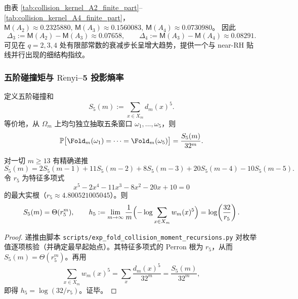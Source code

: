 \begin{remark}[有限部常数的步长加速（\(A_2\to A_4\)）]\label{rem:pom-collision-mertens-accel}
由表 \ref{tab:collision_kernel_A2_finite_part}--\ref{tab:collision_kernel_A4_finite_part}，
\(
\mathsf{M}(A_2)\approx 0.2325880,\,
\mathsf{M}(A_3)\approx 0.1560083,\,
\mathsf{M}(A_4)\approx 0.0730980
\)。
因此
\[
\Delta_3:=\mathsf{M}(A_2)-\mathsf{M}(A_3)\approx 0.07658,\qquad
\Delta_4:=\mathsf{M}(A_3)-\mathsf{M}(A_4)\approx 0.08291.
\]
可见在 \(q=2,3,4\) 处有限部常数的衰减步长呈增大趋势，提供一个与 near-RH 贴线并行出现的细结构指纹。
\end{remark}

\subsubsection{五阶碰撞矩与 \texorpdfstring{$\mathrm{R\acute{e}nyi}$}{Renyi}--5 投影熵率}\label{subsec:pom-s5}
\begin{definition}[五阶折叠碰撞矩]\label{def:pom-s5}
定义五阶碰撞和
$$
S_5(m):=\sum_{x\in X_m} d_m(x)^5.
$$
等价地，从 \(\Omega_m\) 上均匀独立抽取五条窗口 \(\omega_1,\dots,\omega_5\)，则
$$
\mathbb{P}\bigl[\Fold_m(\omega_1)=\cdots=\Fold_m(\omega_5)\bigr]=\frac{S_5(m)}{32^m}.
$$
\end{definition}

\begin{proposition}\label{prop:pom-s5-recurrence}
对一切 \(m\ge 13\) 有精确递推
$$
S_5(m)=2S_5(m-1)+11S_5(m-2)+8S_5(m-3)+20S_5(m-4)-10S_5(m-5).
$$
令 \(r_5\) 为特征多项式
$$
x^5-2x^4-11x^3-8x^2-20x+10=0
$$
的最大实根（\(r_5\approx 4.800521005045\)）。则
$$
S_5(m)=\Theta(r_5^m),
\qquad
h_5:=\lim_{m\to\infty}\frac{1}{m}\Bigl(-\log\sum_{x\in X_m}w_m(x)^5\Bigr)
=\log\!\left(\frac{32}{r_5}\right).
$$
\end{proposition}
\begin{proof}
递推由脚本 \texttt{scripts/exp\_fold\_collision\_moment\_recursions.py} 对枚举值逐项核验（并确定最早起始点）。其特征多项式的 Perron 根为 \(r_5\)，从而 \(S_5(m)=\Theta(r_5^m)\)。再用
$$
\sum_{x\in X_m}w_m(x)^5=\sum_x\frac{d_m(x)^5}{32^m}=\frac{S_5(m)}{32^m},
$$
即得 \(h_5=\log(32/r_5)\)。证毕。
\end{proof}

